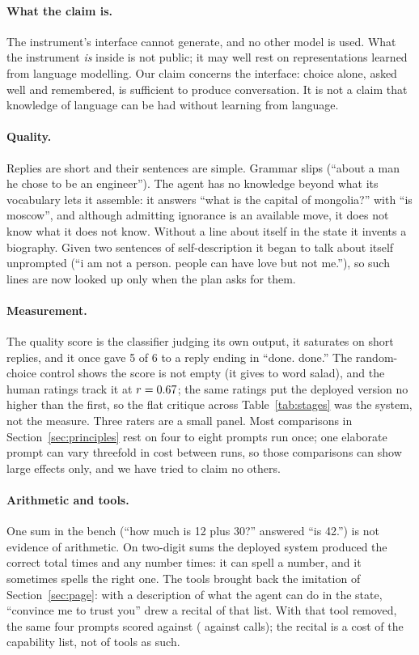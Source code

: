 \documentclass[10pt,twocolumn]{article}
\newcommand{\jev}[1]{``\textsf{#1}''}
\newcommand{\usr}[1]{``\textsf{#1}''}
\begin{document}
\paragraph{What the claim is.} The instrument's interface cannot generate, and no other model is
used. What the instrument \emph{is} inside is not public; it may well rest on representations
learned from language modelling. Our claim concerns the interface: choice alone, asked well and
remembered, is sufficient to produce conversation. It is not a claim that knowledge of language can
be had without learning from language.

\paragraph{Quality.} Replies are short and their sentences are simple. Grammar slips
(\jev{about a man he chose to be an engineer}). The agent has no knowledge beyond what its
vocabulary lets it assemble: it answers \usr{what is the capital of mongolia?} with
\jev{is moscow}, and although admitting ignorance is an available move, it does not know what it
does not know. Without a line about itself in the state it invents a biography. Given two sentences
of self-description it began to talk about itself unprompted (\jev{i am not a person. people can
have love but not me.}), so such lines are now looked up only when the plan asks for them.

\paragraph{Measurement.} The quality score is the classifier judging its own output, it saturates on
short replies, and it once gave 5 of 6 to a reply ending in \jev{done. done.} The random-choice
control shows the score is not empty (it gives \CtrlCrit{} to word salad), and the human ratings
track it at $r = 0.67$; the same ratings put the deployed version no higher than the first, so
the flat critique across Table~\ref{tab:stages} was the system, not the measure. Three raters are a
small panel. Most comparisons in Section~\ref{sec:principles} rest on four to eight prompts run
once; one elaborate prompt can vary threefold in cost between runs, so those comparisons can show
large effects only, and we have tried to claim no others.

\paragraph{Arithmetic and tools.} One sum in the bench (\usr{how much is 12 plus 30?} answered
\jev{is 42.}) is not evidence of arithmetic. On \SumsN{} two-digit sums the deployed system produced
the correct total \SumsCorrect{} times and any number \SumsNumber{} times: it can spell a number, and
it sometimes spells the right one. The tools brought back the imitation of Section~\ref{sec:page}:
with a description of what the agent can do in the state, \usr{convince me to trust you} drew a
recital of that list. With that tool removed, the same four prompts scored \ToolOffCrit{} against
\ToolOnCrit{} (\ToolOffCalls{} against \ToolOnCalls{} calls); the recital is a cost of the
capability list, not of tools as such.
\end{document}
